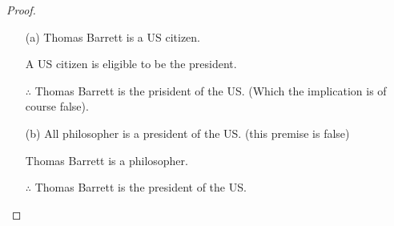 \documentclass{article}
\begin{document}
\begin{proof}
    \begin{itemize}
        \item[(a)] Thomas Barrett is a US citizen.
        
        A US citizen is eligible to be the president.

        $\therefore$ Thomas Barrett is the prisident of the US. (Which the implication is of course false).

        \item[(b)] All philosopher is a president of the US. (this premise is false)
        
        Thomas Barrett is a philosopher.

        $\therefore$ Thomas Barrett is the president of the US.
    \end{itemize}
\end{proof}
\end{document}
